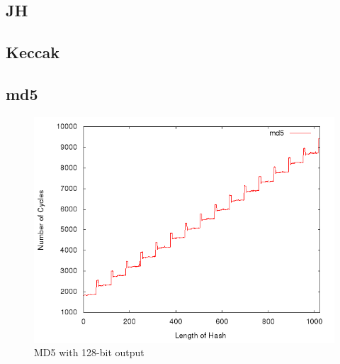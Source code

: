 \documentclass[10pt,a4paper]{article}
\begin{document}
\subsection{JH}

\subsection{Keccak}


\subsection{md5}
\begin{figure}[H]
    \begin{center}
        \includegraphics[scale=0.5]{images/md5.png} 
        \caption{MD5 with 128-bit output}
    \end{center}
\end{figure}
\end{document}

